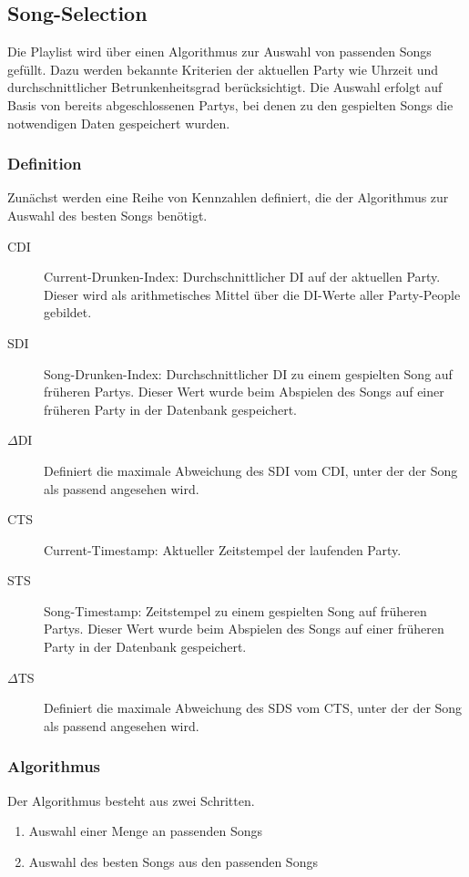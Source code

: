 \subsection{Song-Selection}
\label{sec:SongSelect}
Die Playlist wird über einen Algorithmus zur Auswahl von passenden Songs gefüllt. Dazu werden bekannte Kriterien der aktuellen Party wie Uhrzeit und durchschnittlicher Betrunkenheitsgrad berücksichtigt. Die Auswahl erfolgt auf Basis von bereits abgeschlossenen Partys, bei denen zu den gespielten Songs die notwendigen Daten gespeichert wurden.

\subsubsection{Definition}
Zunächst werden eine Reihe von Kennzahlen definiert, die der Algorithmus zur Auswahl des besten Songs benötigt.

\begin{description}
	\item[CDI] Current-Drunken-Index: Durchschnittlicher DI auf der aktuellen Party. Dieser wird als arithmetisches Mittel über die DI-Werte aller Party-People gebildet.
	\item[SDI] Song-Drunken-Index: Durchschnittlicher DI zu einem gespielten Song auf früheren Partys. Dieser Wert wurde beim Abspielen des Songs auf einer früheren Party in der Datenbank gespeichert.
	\item[$\Delta$DI] Definiert die maximale Abweichung des SDI vom CDI, unter der der Song als passend angesehen wird.
	\item[CTS] Current-Timestamp: Aktueller Zeitstempel der laufenden Party.
	\item[STS] Song-Timestamp: Zeitstempel zu einem gespielten Song auf früheren Partys. Dieser Wert wurde beim Abspielen des Songs auf einer früheren Party in der Datenbank gespeichert.
	\item[$\Delta$TS] Definiert die maximale Abweichung des SDS vom CTS, unter der der Song als passend angesehen wird.
\end{description}

\subsubsection{Algorithmus}
Der Algorithmus besteht aus zwei Schritten.
\begin{enumerate}
	\item Auswahl einer Menge an passenden Songs
	\item Auswahl des besten Songs aus den passenden Songs
\end{enumerate}

